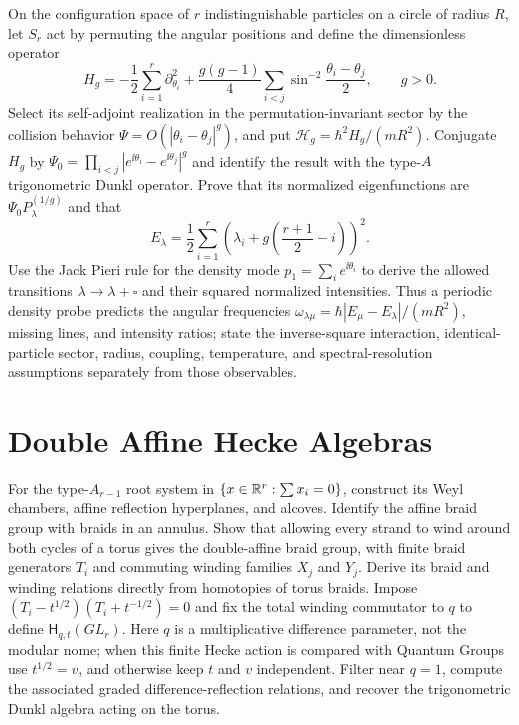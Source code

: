 \begin{exercise}
On the configuration space of $r$ indistinguishable particles on a circle of
radius $R$, let $S_r$ act by permuting the angular positions and define the
dimensionless operator
\[
 H_g=-\frac12\sum_{i=1}^r\partial_{\theta_i}^2
 +\frac{g(g-1)}4\sum_{i<j}
 \sin^{-2}\!\frac{\theta_i-\theta_j}{2},
 \qquad g>0.
\]
Select its self-adjoint realization in the permutation-invariant sector by
the collision behavior
$\Psi=O(|\theta_i-\theta_j|^g)$, and put
$\mathcal H_g=\hbar^2H_g/(mR^2)$.  Conjugate $H_g$ by
$\Psi_0=\prod_{i<j}|e^{\ii\theta_i}-e^{\ii\theta_j}|^g$ and identify the
result with the type-$A$ trigonometric Dunkl operator.  Prove that its
normalized eigenfunctions are $\Psi_0P_\lambda^{(1/g)}$ and that
\[
 E_\lambda=\frac12\sum_{i=1}^r
 \left(\lambda_i+g\left(\frac{r+1}{2}-i\right)\right)^2.
\]
Use the Jack Pieri rule for the density mode
$p_1=\sum_ie^{\ii\theta_i}$ to derive the allowed transitions
$\lambda\to\lambda+\square$ and their squared normalized intensities.
Thus a periodic density probe predicts the angular frequencies
$\omega_{\lambda\mu}=\hbar|E_\mu-E_\lambda|/(mR^2)$, missing lines, and
intensity ratios; state the inverse-square interaction, identical-particle
sector, radius, coupling, temperature, and spectral-resolution assumptions
separately from those observables.
\end{exercise}

\section{Double Affine Hecke Algebras}

\begin{exercise}
For the type-$A_{r-1}$ root system in
$\{x\in\mathbb R^r:\sum x_i=0\}$, construct its Weyl chambers, affine reflection
hyperplanes, and alcoves.  Identify the
affine braid group with braids in an annulus.  Show that allowing every strand
to wind around both cycles of a torus gives the double-affine braid group,
with finite braid generators $T_i$ and commuting winding families $X_j$ and
$Y_j$.  Derive its braid and winding relations directly from homotopies of
torus braids.  Impose
$(T_i-t^{1/2})(T_i+t^{-1/2})=0$ and fix the total winding commutator to $q$ to
 define $\mathsf H_{q,t}(GL_r)$.  Here $q$ is a multiplicative difference
parameter, not the modular nome; when this finite Hecke action is
compared with Quantum Groups use $t^{1/2}=v$, and otherwise keep $t$ and $v$
independent.  Filter near $q=1$, compute the associated graded
difference-reflection relations, and recover the trigonometric Dunkl algebra
acting on the torus.
\end{exercise}

